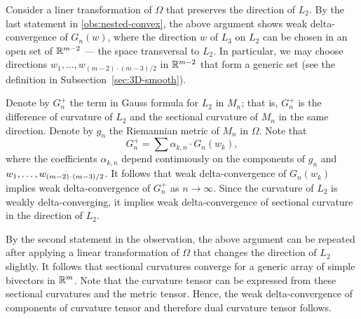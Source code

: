 Consider a liner transformation of $\Omega$ that preserves the direction of $L_2$.
By the last statement in \ref{obs:nested-convex},
the above argument shows weak delta-convergence of $G_n(w)$, where the direction $w$ of $L_3$ on $L_2$ can be chosen in an open set of $\mathbb{R}^{m-2}$ --- the space transversal to $L_2$.
In particular, we may choose directions $w_1,\dots, w_{(m-2)\cdot(m-3)/2}$ in $\mathbb{R}^{m-2}$ that form a generic set (see the  definition in Subsection~\ref{sec:3D-smooth}).

Denote by $G_n^+$ the term in Gauss formula for $L_2$ in $M_n$;
that is, $G_n^+$ is the difference of curvature of $L_2$ and the sectional curvature of $M_n$ in the same direction.
Denote by $g_n$ the Riemannian metric of $M_n$ in $\Omega$.
Note that 
\[G_n^+=\sum\alpha_{k,n}\cdot G_n(w_k),\]
where the coefficients $\alpha_{k,n}$ depend continuously on the components of $g_n$ and $w_1,\zz\dots, w_{(m-2)\cdot(m-3)/2}$. 
It follows that weak delta-convergence of $G_n(w_k)$ implies weak delta-convergence of $G_n^+$ as $n\to\infty$.
Since the curvature of $L_2$ is weakly delta-converging, it implies weak delta-convergence of sectional curvature in the direction of $L_2$.

By the second statement in the observation,
the above argument can be repeated after applying a linear transformation of $\Omega$ that changes the direction of $L_2$ slightly.
It follows that sectional curvatures converge for a generic array of simple bivectors in $\mathbb{R}^m$.
Note that the curvature tensor can be expressed from these sectional curvatures and the metric tensor.
Hence, the weak delta-convergence of components of curvature tensor and therefore dual curvature tensor follows.
\qeds

